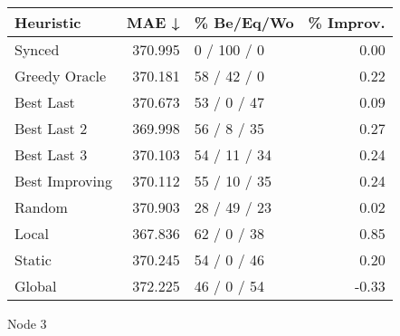 \begin{tabular}{lrlr}
\toprule
\textbf{Heuristic} & \textbf{MAE ↓} & \textbf{\% Be/Eq/Wo} & \textbf{\% Improv.} \\
\midrule
            Synced &        370.995 &          0 / 100 / 0 &                0.00 \\
     Greedy Oracle &        370.181 &          58 / 42 / 0 &                0.22 \\
         Best Last &        370.673 &          53 / 0 / 47 &                0.09 \\
       Best Last 2 &        369.998 &          56 / 8 / 35 &                0.27 \\
       Best Last 3 &        370.103 &         54 / 11 / 34 &                0.24 \\
    Best Improving &        370.112 &         55 / 10 / 35 &                0.24 \\
            Random &        370.903 &         28 / 49 / 23 &                0.02 \\
             Local &        367.836 &          62 / 0 / 38 &                0.85 \\
            Static &        370.245 &          54 / 0 / 46 &                0.20 \\
            Global &        372.225 &          46 / 0 / 54 &               -0.33 \\
\bottomrule
\end{tabular}
\caption{Node 3}
\label{tab:non_lr01_le1_bs4_3}
